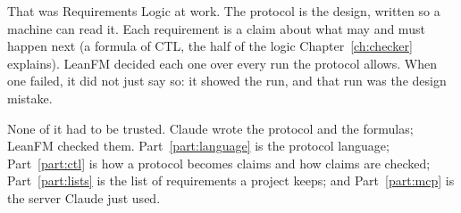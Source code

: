 That was Requirements Logic at work. The protocol is the design, written so a machine can
read it. Each requirement is a claim about what may and must happen next (a formula of CTL,
the half of the logic Chapter~\ref{ch:checker} explains). LeanFM decided each
one over every run the protocol allows. When one failed, it did not just say so: it showed the
run, and that run was the design mistake.

None of it had to be trusted. Claude wrote the protocol and the formulas; LeanFM checked them.
Part~\ref{part:language} is the protocol language; Part~\ref{part:ctl} is how a protocol
becomes claims and how claims are checked; Part~\ref{part:lists} is the list of requirements a project
keeps; and Part~\ref{part:mcp} is the server Claude just used.
